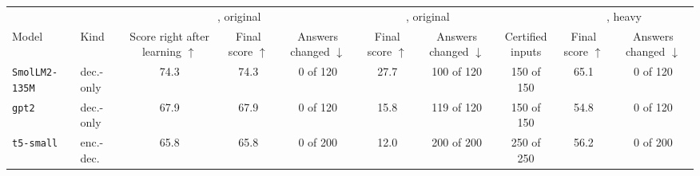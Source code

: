 \begin{tabular}{llcccccccc}
    \toprule
    & & \multicolumn{3}{c}{\cert{}, original} & \multicolumn{2}{c}{\plain{}, original} & & \multicolumn{2}{c}{\cert{}, heavy} \\
    \cmidrule(lr){3-5} \cmidrule(lr){6-7} \cmidrule(lr){9-10}
    Model & Kind & \shortstack[c]{Score\\right\\after\\learning\\$\uparrow$} & \shortstack[c]{Final\\score\\$\uparrow$} & \shortstack[c]{Answers\\changed $\downarrow$} & \shortstack[c]{Final\\score\\$\uparrow$} & \shortstack[c]{Answers\\changed $\downarrow$} & \shortstack[c]{Certified\\inputs} & \shortstack[c]{Final\\score\\$\uparrow$} & \shortstack[c]{Answers\\changed $\downarrow$} \\
    \midrule
    \texttt{SmolLM2-135M} & dec.-only & 74.3 & 74.3 & 0 of 120 & 27.7 & 100 of 120 & 150 of 150 & 65.1 & 0 of 120 \\
    \texttt{gpt2} & dec.-only & 67.9 & 67.9 & 0 of 120 & 15.8 & 119 of 120 & 150 of 150 & 54.8 & 0 of 120 \\
    \texttt{t5-small} & enc.-dec. & 65.8 & 65.8 & 0 of 200 & 12.0 & 200 of 200 & 250 of 250 & 56.2 & 0 of 200 \\
    \bottomrule
\end{tabular}
